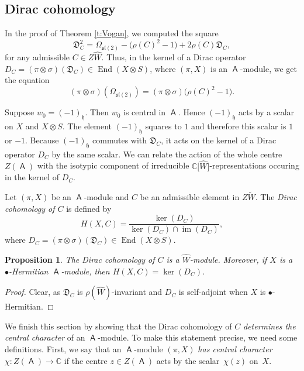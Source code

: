 \documentclass[10pt,a4paper]{amsart}
\numberwithin{equation}{section}
\newtheorem{Proposition}[Theorem]{Proposition}
 { \theoremstyle{definition}
\newtheorem{Definition}[Theorem]{Definition}
\newtheorem{Note}[Theorem]{Note}
\newtheorem{Example}[Theorem]{Example}
\newtheorem{Remark}[Theorem]{Remark} }
\DeclareMathOperator{\End}{End}
\DeclareMathOperator{\im}{im}
\newcommand{\fh}{\mathfrak{h}}
\newcommand{\fl}{\mathfrak{l}}
\newcommand{\fs}{\mathfrak{s}}
\newcommand{\bbc}{\mathbb{C}}
\DeclareMathOperator{\ama}{\mathsf{A}}
\begin{document}
\subsection{Dirac cohomology}

In the proof of Theorem \ref{t:Vogan}, we computed the square
\begin{equation}\label{e:C-Diracsquare}
 \mathfrak{D}_C^2 = \Omega_{\mathfrak{sl}(2)} - \big(\rho(C)^2 - 1\big) + 2\rho(C)\mathfrak{D}_C,
\end{equation}
for any admissible $C\in Z\hat W$. Thus, in the kernel of a Dirac operator $D_C = (\pi\otimes\sigma)(\mathfrak{D}_C) \in \End(X\otimes S)$, where $(\pi,X)$ is an $\ama$-module, we get the equation
\[
(\pi\otimes\sigma)(\Omega_{\fs\fl(2)}) = (\pi\otimes\sigma)\big(\rho(C)^2 -1\big).
\]

Suppose $w_0=(-1)_\fh$. Then $w_0$ is central in $\ama$. Hence $(-1)_\fh$ acts by a scalar on $X$ and $X \otimes S$. The element $(-1)_\fh$ squares to $1$ and therefore this scalar is $1$ or $-1$. Because $(-1)_\fh$ commutes with $\mathfrak{D}_C$, it acts on the kernel of a Dirac operator $D_C$ by the same scalar. We can relate the action of the whole centre $Z(\ama)$ with the isotypic component of irreducible $\bbc\big[\hat{W}\big]$-representations occuring in the kernel of $D_C$.

\begin{Definition}\label{d:DiracCoh}
Let $(\pi,X)$ be an $\ama$-module and $C$ be an admissible element in $Z\tilde W$. The {\it Dirac cohomology of $C$} is defined by
\[
H(X,C) = \frac{\ker(D_C)}{\ker(D_C)\cap \im(D_C)},
\]
where $D_C = (\pi\otimes\sigma)(\mathfrak{D}_C) \in \End(X\otimes S)$.
\end{Definition}

\begin{Proposition}\label{p:unitarycoh}
The Dirac cohomology of $C$ is a $\hat W$-module. Moreover, if $X$ is a $\bullet$-Hermitian $\ama$-module, then $H(X,C) = \ker(D_C)$.
\end{Proposition}

\begin{proof}
Clear, as $\mathfrak{D}_C$ is $\rho(\hat{W})$-invariant and $D_C$ is self-adjoint when $X$ is $\bullet$-Hermitian.
\end{proof}

We finish this section by showing that the Dirac cohomology of $C$ {\it determines the central character} of an $\ama$-module. To make this statement precise, we need some definitions. First, we say that an $\ama$-module $(\pi,X)$ {\it has central character $\chi\colon Z(\ama)\to \bbc$} if the centre $z \in Z(\ama)$ acts by the scalar~$\chi(z)$ on~$X$.
\end{document}

